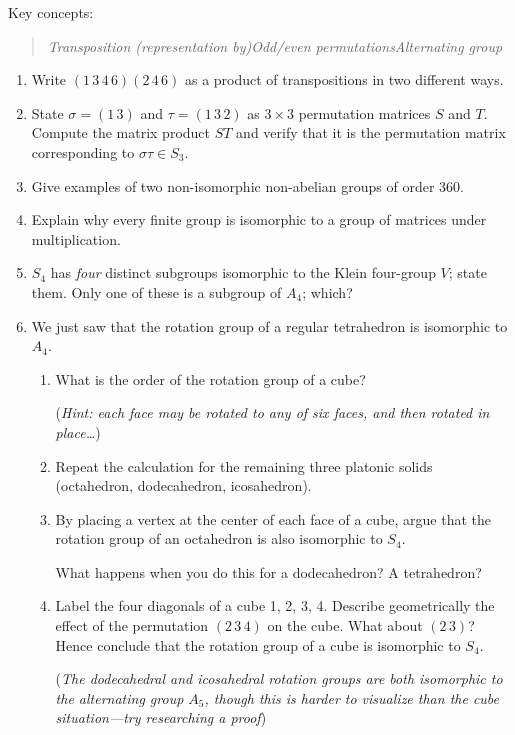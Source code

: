 \begin{exercises}
	Key concepts:
	\begin{quote}
		\emph{Transposition (representation by)\quad Odd/even permutations\quad Alternating group}
	\end{quote}
	
	\begin{enumerate}
	  \item Write $(1\,3\,4\,6)(2\,4\,6)$ as a product of transpositions in two different ways.
	  
	  
	  \item State $\sigma=(1\,3)$ and $\tau=(1\,3\,2)$ as $3\times 3$ permutation matrices $S$ and $T$. Compute the matrix product $ST$ and verify that it is the permutation matrix corresponding to $\sigma\tau\in S_3$.
	  
	  
	  \item Give examples of two non-isomorphic non-abelian groups of order 360.
	  
	  
	  \item Explain why every finite group is isomorphic to a group of matrices under multiplication.
	  
	  
	  \item $S_4$ has \emph{four} distinct subgroups isomorphic to the Klein four-group $V$; state them. Only one of these is a subgroup of $A_4$; which?
	  
	  
	  \item We just saw that the rotation group of a regular tetrahedron is isomorphic to $A_4$.
	  \begin{enumerate}
	    \item What is the order of the rotation group of a cube?\par
	    (\emph{Hint: each face may be rotated to any of six faces, and then rotated in place\ldots})
	    
	    \item Repeat the calculation for the remaining three platonic solids (octahedron, dodecahedron, icosahedron).
	    
	    \item By placing a vertex at the center of each face of a cube, argue that the rotation group of an octahedron is also isomorphic to $S_4$.\par
	    What happens when you do this for a dodecahedron? A tetrahedron?
	    
	    \item Label the four diagonals of a cube 1, 2, 3, 4. Describe geometrically the effect of the permutation $(2\,3\,4)$ on the cube. What about $(2\,3)$? Hence conclude that the rotation group of a cube is isomorphic to $S_4$.\par
	    (\emph{The dodecahedral and icosahedral rotation groups are both isomorphic to the alternating group $A_5$, though this is harder to visualize than the cube situation---try researching a proof})
	  \end{enumerate}
	  

\end{enumerate}
\end{exercises}
